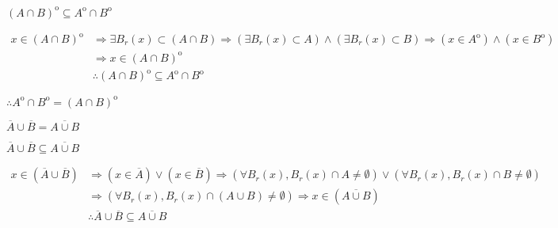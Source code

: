 \documentclass[secnumarabic,balancelastpage,amsmath,amssymb]{article}
\def\lthtmlcheckvsize{\ifdim\ht\sizebox<\vsize 
  \ifdim\wd\sizebox<\hsize\expandafter\hfill\fi \expandafter\vfill
  \else\expandafter\vss\fi}%
\begin{document}
{\newpage\clearpage
{}%
$ (A \cap B)^{\mathrm{o}} \subseteq A^{\mathrm{o}} \cap B^{\mathrm{o}} $%
\lthtmlindisplaymathZ
\lthtmlcheckvsize\clearpage}

{\newpage\clearpage
{}%
\begin{equation*}
\begin{aligned}
x \in (A \cap B)^{\mathrm{o}} & \Rightarrow \exists B_r(x) \subset (A \cap B) \Rightarrow (\exists B_r(x) \subset A) \land (\exists B_r(x) \subset B) \Rightarrow (x \in A^{\mathrm{o}})\land(x \in B^{\mathrm{o}}) \\
& \Rightarrow x\in (A \cap B)^{\mathrm{o}} \\
& \therefore  (A \cap B)^{\mathrm{o}} \subseteq A^{\mathrm{o}} \cap B^{\mathrm{o}}
\end{aligned}\end{equation*}%
\lthtmldisplayZ
\lthtmlcheckvsize\clearpage}

{\newpage\clearpage
{}%

$ \therefore  A^{\mathrm{o}} \cap B^{\mathrm{o}} =  (A \cap B)^{\mathrm{o}}$%
\lthtmlindisplaymathZ
\lthtmlcheckvsize\clearpage}

{\newpage\clearpage
{}%
$ \overline{A} \cup \overline{B} = \overline{A \cup B}$%
\lthtmlindisplaymathZ
\lthtmlcheckvsize\clearpage}

{\newpage\clearpage
{}%
$ \overline{A} \cup \overline{B} \subseteq \overline{A \cup B}$%
\lthtmlindisplaymathZ
\lthtmlcheckvsize\clearpage}

{\newpage\clearpage
{}%
\begin{equation*}
\begin{aligned}
x \in  (\overline{A} \cup \overline{B} ) &\Rightarrow (x \in \overline{A}) \lor (x \in \overline{B}) \Rightarrow (\forall B_r(x), B_r(x) \cap A \neq \emptyset) \lor (\forall B_r(x), B_r(x) \cap B \neq \emptyset) \\
& \Rightarrow (\forall B_r(x), B_r(x) \cap (A \cup B) \neq \emptyset) \Rightarrow x \in (\overline{A \cup B}) \\
& \therefore \overline{A} \cup \overline{B} \subseteq \overline{A \cup B}
\end{aligned}\end{equation*}%
\lthtmldisplayZ
\lthtmlcheckvsize\clearpage}
\end{document}
